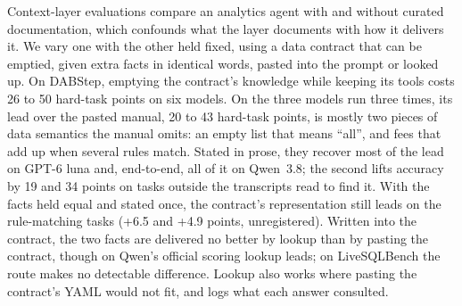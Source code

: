 Context-layer evaluations compare an analytics agent with and without
curated documentation, which confounds what the layer documents with how it
delivers it. We vary one with the other held fixed, using a data contract
that can be emptied, given extra facts in identical words, pasted into the
prompt or looked up. On DABStep, emptying the contract's knowledge while
keeping its tools costs 26 to 50 hard-task points on six models. On the
three models run three times, its lead over the pasted manual, 20 to 43
hard-task points, is mostly two pieces of
data semantics the manual omits: an empty list that means ``all'', and fees
that add up when several rules match. Stated in prose, they recover most of
the lead on GPT-6 luna and, end-to-end, all of it on Qwen~3.8; the second
lifts accuracy by 19 and 34 points on tasks outside the transcripts read
to find it. With the facts held equal and stated once, the contract's
representation still leads on the rule-matching tasks (+6.5 and +4.9
points, unregistered). Written into the contract, the two facts are
delivered no better by lookup than by pasting the contract, though on
Qwen's official scoring lookup leads; on LiveSQLBench the route makes no
detectable difference. Lookup also works where pasting
the contract's YAML would not fit, and logs what each answer consulted.
